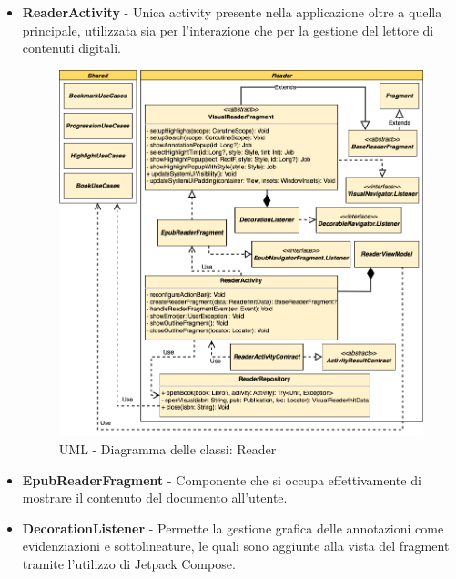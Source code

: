\begin{itemize}
    \item \textbf{ReaderActivity} - Unica activity presente nella applicazione oltre a quella principale, utilizzata sia per l’interazione che per la gestione del lettore di contenuti digitali.

    \begin{figure}[H]
        \centering
        \includegraphics[width=1\textwidth]{img/reader-uml.png}
        \caption{UML - Diagramma delle classi: Reader}
        \label{reader-uml}
    \end{figure}
    
    \item \textbf{EpubReaderFragment} - Componente che si occupa effettivamente di mostrare il contenuto del documento all'utente.
    \item \textbf{DecorationListener} - Permette la gestione grafica delle annotazioni come evidenziazioni e sottolineature, le quali sono aggiunte alla vista del fragment tramite l'utilizzo di Jetpack Compose.
\end{itemize}

\newpage

